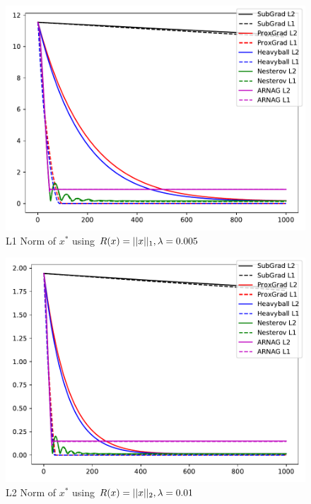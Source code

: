 \documentclass[11pt, answers]{exam}
\begin{document}
		\begin{figure}[H]
		\centering
		\includegraphics[width=.75\textwidth]{../out/005xl1.pdf}
		\caption{L1 Norm of $x^*$ using $R(x)=|| x ||_1,\lambda=0.005$}
		\end{figure}		\begin{figure}[H]
		\centering
		\includegraphics[width=.75\textwidth]{../out/01xl2.pdf}
		\caption{L2 Norm of $x^*$ using $R(x)=|| x ||_2,\lambda=0.01$}
		\end{figure}
\end{document}
